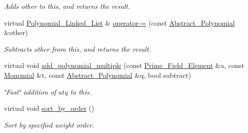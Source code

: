 \begin{Indent}
\begin{DoxyCompactItemize}
\begin{DoxyCompactList}\small\item\em Adds {\ttfamily other} to {\ttfamily this}, and returns the result. \end{DoxyCompactList}\item 
\mbox{\label{class_polynomial___linked___list_ab6c8b12b0d3d9ecf1c6a6e3b8af3f350}} 
virtual \hyperlink{class_polynomial___linked___list}{Polynomial\+\_\+\+Linked\+\_\+\+List} \& \hyperlink{class_polynomial___linked___list_ab6c8b12b0d3d9ecf1c6a6e3b8af3f350}{operator-\/=} (const \hyperlink{class_abstract___polynomial}{Abstract\+\_\+\+Polynomial} \&other)
\begin{DoxyCompactList}\small\item\em Subtracts {\ttfamily other} from {\ttfamily this}, and returns the result. \end{DoxyCompactList}\item 
virtual void \hyperlink{class_polynomial___linked___list_a5f2b566107fb8894172f4e309320ee07}{add\+\_\+polynomial\+\_\+multiple} (const \hyperlink{class_prime___field___element}{Prime\+\_\+\+Field\+\_\+\+Element} \&a, const \hyperlink{class_monomial}{Monomial} \&t, const \hyperlink{class_abstract___polynomial}{Abstract\+\_\+\+Polynomial} \&q, bool subtract)
\begin{DoxyCompactList}\small\item\em \char`\"{}\+Fast\char`\"{} addition of $atq$ to {\ttfamily this}. \end{DoxyCompactList}\item 
\mbox{\label{class_polynomial___linked___list_a090952238fa270da20b6b78dd43092b8}} 
virtual void \hyperlink{class_polynomial___linked___list_a090952238fa270da20b6b78dd43092b8}{sort\+\_\+by\+\_\+order} ()
\begin{DoxyCompactList}\small\item\em Sort by specified weight order. \end{DoxyCompactList}\end{DoxyCompactItemize}
\end{Indent}

